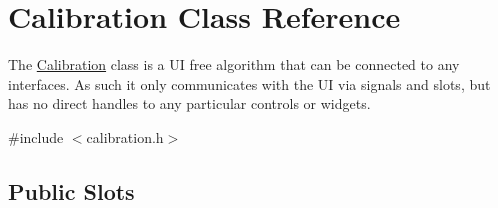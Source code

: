 \hypertarget{class_calibration}{\section{\-Calibration \-Class \-Reference}
\label{class_calibration}
}


\-The \hyperlink{class_calibration}{\-Calibration} class is a \-U\-I free algorithm that can be connected to any interfaces. \-As such it only communicates with the \-U\-I via signals and slots, but has no direct handles to any particular controls or widgets.  




{\ttfamily \#include $<$calibration.\-h$>$}

\subsection*{\-Public \-Slots}
